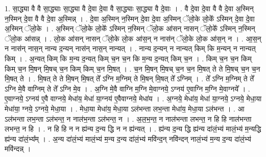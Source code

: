 \documentclass[17pt]{extarticle}
\begin{document}
1. सा॒द्ध्या वै वै सा॒द्ध्याः सा॒द्ध्या वै दे॒वा दे॒वा वै सा॒द्ध्याः सा॒द्ध्या वै दे॒वाः । . वै दे॒वा दे॒वा वै वै दे॒वा अ॒स्मिन् न॒स्मिन् दे॒वा वै वै दे॒वा अ॒स्मिन्न् । . दे॒वा अ॒स्मिन् न॒स्मिन् दे॒वा दे॒वा अ॒स्मिन् ॅलो॒के लो॒के᳚ ऽस्मिन् दे॒वा दे॒वा अ॒स्मिन् ॅलो॒के । . अ॒स्मिन् ॅलो॒के लो॒के᳚ ऽस्मिन् न॒स्मिन् ॅलो॒क आ॑सन् नासन् ॅलो॒के᳚ ऽस्मिन् न॒स्मिन् ॅलो॒क आ॑सन्न् । . लो॒क आ॑सन् नासन् ॅलो॒के लो॒क आ॑स॒न् न नास॑न् ॅलो॒के लो॒क आ॑स॒न् न । . आ॒स॒न् न नास॑न् नास॒न् नान्य द॒न्यन् नास॑न् नास॒न् नान्यत् । . नान्य द॒न्यन् न नान्यत् किम् कि म॒न्यन् न नान्यत् किम् । . अ॒न्यत् किम् कि म॒न्य द॒न्यत् किम् च॒न च॒न कि म॒न्य द॒न्यत् किम् च॒न । . किम् च॒न च॒न किम् किम् च॒न मि॒षन् मि॒षच् च॒न किम् किम् च॒न मि॒षत् । . च॒न मि॒षन् मि॒षच् च॒न च॒न मि॒षत् ते ते मि॒षच् च॒न च॒न मि॒षत् ते । . मि॒षत् ते ते मि॒षन् मि॒षत् ते᳚ ऽग्नि म॒ग्निम् ते मि॒षन् मि॒षत् ते᳚ ऽग्निम् । . ते᳚ ऽग्नि म॒ग्निम् ते ते᳚ ऽग्नि मे॒वै वाग्निम् ते ते᳚ ऽग्नि मे॒व । . अ॒ग्नि मे॒वै वाग्नि म॒ग्नि मे॒वाग्नये॒ ऽग्नय॑ ए॒वाग्नि म॒ग्नि मे॒वाग्नये᳚ । . ए॒वाग्नये॒ ऽग्नय॑ ए॒वै वाग्नये॒ मेधा॑य॒ मेधा॑ या॒ग्नय॑ ए॒वैवाग्नये॒ मेधा॑य । . अ॒ग्नये॒ मेधा॑य॒ मेधा॑ या॒ग्नये॒ ऽग्नये॒ मेधा॒या मेधा॑या॒ ग्नये॒ ऽग्नये॒ मेधा॒या । . मेधा॒या मेधा॑य॒ मेधा॒या ऽल॑भन्ता लभ॒न्ता मेधा॑य॒ मेधा॒या ऽल॑भन्त । . आ ऽल॑भन्ता लभ॒न्ता ऽल॑भन्त॒ न नाल॑भ॒न्ता ऽल॑भन्त॒ न । . अ॒ल॒भ॒न्त॒ न नाल॑भन्ता लभन्त॒ न हि हि नाल॑भन्ता लभन्त॒ न हि । . न हि हि न न ह्य॑न्य द॒न्य द्धि न न ह्य॑न्यत् । . ह्य॑न्य द॒न्य द्धि ह्य॑न्य दा॑लं॒भ्य॑ मालं॒भ्य॑ म॒न्यद्धि ह्य॑न्य दा॑लं॒भ्य᳚म् । . अ॒न्य दा॑लं॒भ्य॑ मालं॒भ्य॑ म॒न्य द॒न्य दा॑लं॒भ्य॑ मवि॑न्द॒न् नवि॑न्दन् नालं॒भ्य॑ म॒न्य द॒न्य दा॑लं॒भ्य॑ मवि॑न्दन्न् । \newline
\end{document}
